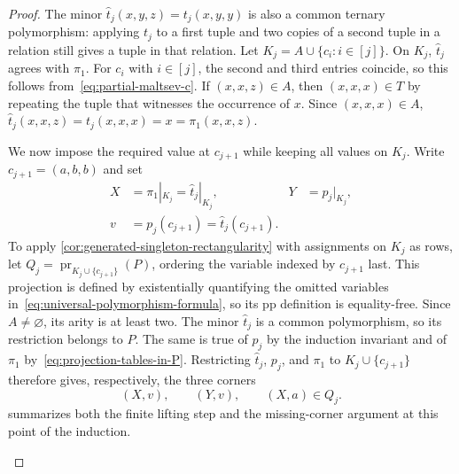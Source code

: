 \documentclass[11pt,letterpaper,onecolumn]{article}
\theoremstyle{plain}
\theoremstyle{definition}
\theoremstyle{remark}
\DeclareMathOperator{\pr}{pr}
\begin{document}
\begin{proof}
The minor $\widehat t_j(x,y,z)=t_j(x,y,y)$ is also a common ternary
polymorphism: applying $t_j$ to a first tuple and two copies of a second
tuple in a relation still gives a tuple in that relation.  Let
$K_j=A\cup\{c_i:i\in[j]\}$.  On $K_j$, $\widehat t_j$ agrees with $\pi_1$.
For $c_i$ with $i\in[j]$, the second and third entries coincide, so
this follows from~\eqref{eq:partial-maltsev-c}.
If $(x,x,z)\in A$, then $(x,x,x)\in T$ by repeating the tuple that witnesses
the occurrence of $x$.  Since $(x,x,x)\in A$, $\widehat t_j(x,x,z)=t_j(x,x,x)=x=\pi_1(x,x,z)$.

We now impose the required value at $c_{j+1}$ while keeping all values
on $K_j$.  Write $c_{j+1}=(a,b,b)$ and set
\[
\begin{aligned}
  X&=\pi_1|_{K_j}=\widehat t_j|_{K_j},
  &Y&=p_j|_{K_j},\\
  v&=p_j(c_{j+1})=\widehat t_j(c_{j+1}).
\end{aligned}
\]
To apply \cref{cor:generated-singleton-rectangularity} with assignments on
$K_j$ as rows, let $Q_j=\pr_{K_j\cup\{c_{j+1}\}}(P)$, ordering the variable
indexed by $c_{j+1}$ last.  This projection is defined by existentially
quantifying the omitted variables in~\eqref{eq:universal-polymorphism-formula},
so its pp definition is equality-free.  Since $A\ne\varnothing$, its
arity is at least two.  The minor $\widehat t_j$ is a common polymorphism, so its
restriction belongs to $P$. The same is true of $p_j$ by the induction
invariant and of $\pi_1$ by~\eqref{eq:projection-tables-in-P}.  Restricting
$\widehat t_j$, $p_j$, and $\pi_1$ to $K_j\cup\{c_{j+1}\}$ therefore gives,
respectively, the three corners
\begin{equation*}
  (X,v),\qquad(Y,v),\qquad(X,a)\in Q_j.
\end{equation*}
 summarizes both the finite lifting step
and the missing-corner argument at this point of the induction.

\begin{figure}[!t]
  \centering
\end{figure}
\end{proof}
\end{document}
